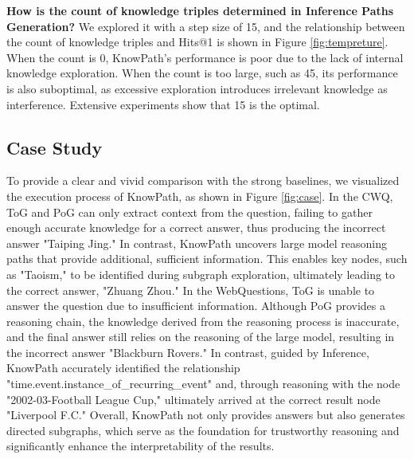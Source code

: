 \textbf{How is the count of knowledge triples determined in Inference Paths Generation?}
We explored it with a step size of 15, and the relationship between the count of knowledge triples and Hits@1 is shown in Figure \ref{fig:tempreture}.
When the count is 0, KnowPath's performance is poor due to the lack of internal knowledge exploration. When the count is too large, such as 45, its performance is also suboptimal, as excessive exploration introduces irrelevant knowledge as interference. Extensive experiments show that 15 is the optimal.

\subsection{Case Study}



To provide a clear and vivid comparison with the strong baselines, we visualized the execution process of KnowPath, as shown in Figure \ref{fig:case}. 
In the CWQ, ToG and PoG can only extract context from the question, failing to gather enough accurate knowledge for a correct answer, thus producing the incorrect answer "Taiping Jing." In contrast, KnowPath uncovers large model reasoning paths that provide additional, sufficient information. This enables key nodes, such as "Taoism," to be identified during subgraph exploration, ultimately leading to the correct answer, "Zhuang Zhou."
In the WebQuestions, ToG is unable to answer the question due to insufficient information. 
Although PoG provides a reasoning chain, the knowledge derived from the reasoning process is inaccurate, and the final answer still relies on the reasoning of the large model, resulting in the incorrect answer "Blackburn Rovers."
In contrast, guided by Inference, KnowPath accurately identified the relationship "time.event.instance\_of\_recurring\_event" and, through reasoning with the node "2002-03-Football League Cup," ultimately arrived at the correct result node "Liverpool F.C."
Overall, KnowPath not only provides answers but also generates directed subgraphs, which serve as the foundation for trustworthy reasoning and significantly enhance the interpretability of the results.